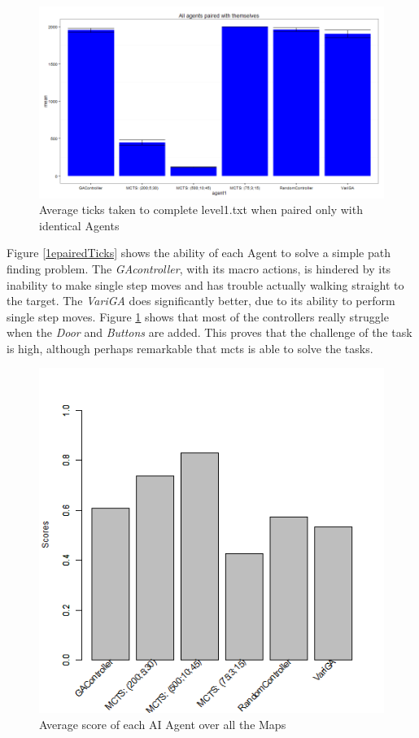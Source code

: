 \documentclass{IEEEtran}
\begin{document}
\begin{figure}[ht]
\centering
\includegraphics[width=\linewidth]{level1-txt-pairs-ticks}
\caption{Average ticks taken to complete level1.txt when paired only with identical Agents}
\label{1pairedTicks}
\end{figure}

Figure \ref{1epairedTicks} shows the ability of each Agent to solve a simple path finding problem. The \emph{GAcontroller}, with its macro actions, is hindered by its inability to make single step moves and has trouble actually walking straight to the target. The \emph{VariGA} does significantly better, due to its ability to perform single step moves. Figure \ref{1pairedTicks} shows that most of the controllers really struggle when the \emph{Door} and \emph{Buttons} are added. This proves that the challenge of the task is high, although perhaps remarkable that \gls{mcts} is able to solve the tasks.

\begin{figure}[ht]
\centering
\includegraphics[width=\linewidth]{scores-allmaps}
\caption{Average score of each AI Agent over all the Maps}
\label{avgScoreAllMaps}
\end{figure}
\end{document}
